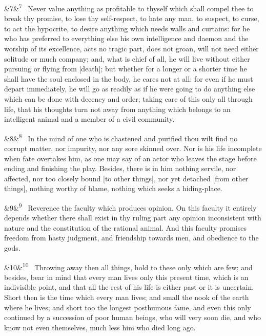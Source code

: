 \documentclass[12pt]{article}
\newcommand{\para}[1][]{\par\noindent\ifx&#1&\else\textsuperscript{\footnotesize #1}~\fi}
\begin{document}
\para[7] Never value anything as profitable to thyself which shall compel thee
to break thy promise, to lose thy self-respect, to hate any man, to
suspect, to curse, to act the hypocrite, to desire anything which needs
walls and curtains: for he who has preferred to everything else his own
intelligence and daemon and the worship of its excellence, acts no
tragic part, does not groan, will not need either solitude or much
company; and, what is chief of all, he will live without either pursuing
or flying from [death]; but whether for a longer or a shorter time he
shall have the soul enclosed in the body, he cares not at all: for even
if he must depart immediately, he will go as readily as if he were going
to do anything else which can be done with decency and order; taking
care of this only all through life, that his thoughts turn not away from
anything which belongs to an intelligent animal and a member of a civil
community.

\para[8] In the mind of one who is chastened and purified thou wilt find no
corrupt matter, nor impurity, nor any sore skinned over. Nor is his life
incomplete when fate overtakes him, as one may say of an actor who
leaves the stage before ending and finishing the play. Besides, there is
in him nothing servile, nor affected, nor too closely bound [to other
things], nor yet detached [from other things], nothing worthy of
blame, nothing which seeks a hiding-place.

\para[9] Reverence the faculty which produces opinion. On this faculty it
entirely depends whether there shall exist in thy ruling part any
opinion inconsistent with nature and the constitution of the rational
animal. And this faculty promises freedom from hasty judgment, and
friendship towards men, and obedience to the gods.

\para[10] Throwing away then all things, hold to these only which are few; and
besides, bear in mind that every man lives only this present time, which
is an indivisible point, and that all the rest of his life is either
past or it is uncertain. Short then is the time which every man lives;
and small the nook of the earth where he lives; and short too the
longest posthumous fame, and even this only continued by a succession of
poor human beings, who will very soon die, and who know not even
themselves, much less him who died long ago.
\end{document}
